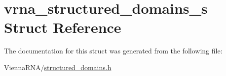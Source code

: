 \hypertarget{structvrna__structured__domains__s}{}\section{vrna\+\_\+structured\+\_\+domains\+\_\+s Struct Reference}
\label{structvrna__structured__domains__s}


The documentation for this struct was generated from the following file\+:\begin{DoxyCompactItemize}
\item 
Vienna\+R\+N\+A/\mbox{\hyperlink{structured__domains_8h}{structured\+\_\+domains.\+h}}\end{DoxyCompactItemize}

